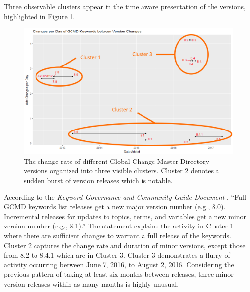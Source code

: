 Three observable clusters appear in the time aware presentation of the \glspl{version}, highlighted in Figure \ref{GCMDPlot1Cluster}.
\begin{figure}%
	\centering
	\includegraphics[scale=0.56]{figures/GCMDPlot1_Cluster.png}
	\caption[Global Change Master Directory count distributed over time with clusters marked.]{The change rate of different Global Change Master Directory versions organized into three visible clusters. Cluster 2 denotes a sudden burst of version releases which is notable.}
	\label{GCMDPlot1Cluster}
\end{figure}
According to the \textit{Keyword Governance and Community Guide Document} \cite{gcmd_gov}, ``Full GCMD keywords list releases get a new major version number (e.g., 8.0). Incremental releases for updates to topics, terms, and variables get a new minor version number (e.g., 8.1).”
The statement explains the activity in Cluster 1 where there are sufficient \glspl{change} to warrant a full release of the keywords.
Cluster 2 captures the change rate and duration of minor versions, except those from 8.2 to 8.4.1 which are in Cluster 3.
Cluster 3 demonstrates a flurry of activity occurring between June 7, 2016, to August 2, 2016.
Considering the previous pattern of taking at least six months between releases, three minor version releases within as many months is highly unusual.

